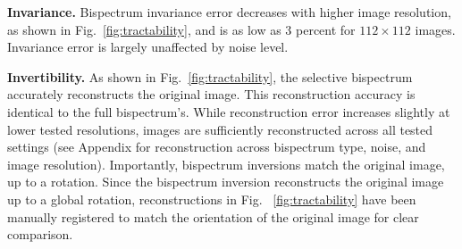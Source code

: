 \textbf{Invariance.} Bispectrum invariance error decreases with higher image resolution, as shown in Fig.~\ref{fig:tractability}, and is as low as $3$ percent for $112\times112$ images. Invariance error is largely unaffected by noise level.

\textbf{Invertibility.} As shown in Fig.~\ref{fig:tractability}, the selective bispectrum accurately reconstructs the original image. This reconstruction accuracy is identical to the full bispectrum's. While reconstruction error increases slightly at lower tested resolutions, images are sufficiently reconstructed across all tested settings (see Appendix for reconstruction across bispectrum type, noise, and image resolution). Importantly, bispectrum inversions match the original image, up to a rotation. Since the bispectrum inversion reconstructs the original image up to a global rotation, reconstructions in Fig. ~\ref{fig:tractability} have been manually registered to match the orientation of the original image for clear comparison.
